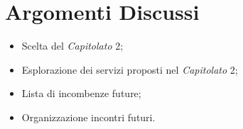\section{Argomenti Discussi}
	\begin{itemize}
		\item Scelta del \textit{Capitolato\glo} 2;
		\item Esplorazione dei servizi proposti nel \textit{Capitolato\glo} 2;
        \item Lista di incombenze future;
		\item Organizzazione incontri futuri.
	\end{itemize}
